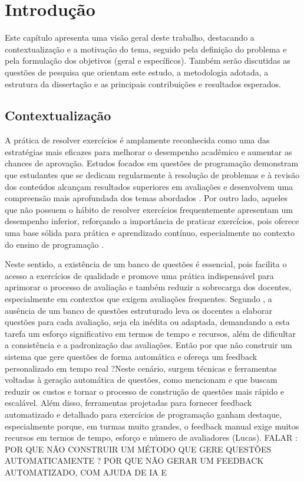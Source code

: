\chapter{Introdução}\label{cap:modelo}

Este capítulo apresenta uma visão geral deste trabalho, destacando a contextualização e a motivação do tema, seguido pela definição do problema e pela formulação dos objetivos (geral e específicos). Também serão discutidas as questões de pesquisa que orientam este estudo, a metodologia adotada, a estrutura da dissertação e as principais contribuições e resultados esperados. 

\section{Contextualização}

A prática de resolver exercícios é amplamente reconhecida como uma das estratégias mais eficazes para melhorar o desempenho acadêmico e aumentar as chances de aprovação. Estudos focados em questões de programação demonstram que estudantes que se dedicam regularmente à resolução de problemas e à revisão dos conteúdos alcançam resultados superiores em avaliações e desenvolvem uma compreensão mais aprofundada dos temas abordados \parencite{Ahadi2016}. Por outro lado,  aqueles que não possuem o hábito de resolver exercícios frequentemente apresentam um desempenho inferior, reforçando a importância de praticar exercícios, pois oferece uma base sólida para prática e aprendizado contínuo,  especialmente no contexto do ensino de programação \parencite{Edwards2019}.  

Neste sentido, a existência de um banco de questões é essencial, pois facilita o acesso a exercícios de qualidade e promove uma prática indispensável para aprimorar o processo de avaliação e também reduzir a sobrecarga dos docentes, especialmente em contextos que exigem avaliações frequentes. Segundo   \parencite{Puthiaparampil2020} , a ausência de um banco de questões estruturado leva os docentes a elaborar questões  para cada avaliação, seja ela inédita ou adaptada,  demandando a esta tarefa um esforço significativo em termos de tempo e recursos, além de dificultar a consistência e a padronização das avaliações.   Então por que não construir um sistema que gere questões de forma automática e ofereça um feedback personalizado em tempo real ?Neste cenário, surgem técnicas e ferramentas voltadas à geração automática de questões, como mencionam \parencite{kurdi2020} e \parencite{sewunetie2022}  que buscam reduzir os custos e tornar o processo de construção de questões mais rápido e escalável. Além disso, ferramentas projetadas para fornecer feedback automatizado e detalhado para exercícios de programação ganham destaque, especialmente porque, em turmas muito grandes, o feedback manual exige muitos recursos em termos de tempo, esforço e número de avaliadores (Lucas).
FALAR :  POR QUE NÃO CONSTRUIR UM MÉTODO QUE GERE QUESTÕES AUTOMATICAMENTE ? POR QUE NÃO GERAR UM FEEDBACK AUTOMATIZADO, COM AJUDA DE IA E

